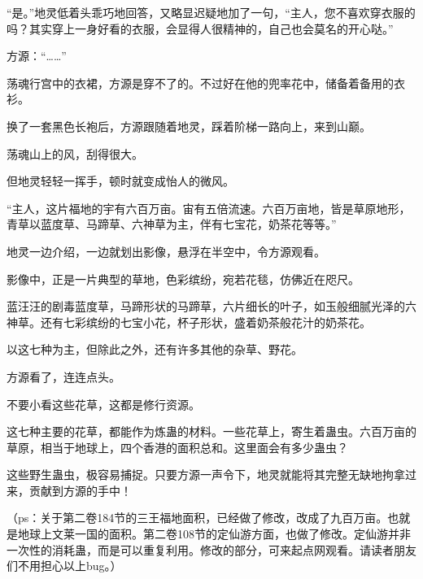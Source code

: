 \begin{this_body}
“是。”地灵低着头乖巧地回答，又略显迟疑地加了一句，“主人，您不喜欢穿衣服的吗？其实穿上一身好看的衣服，会显得人很精神的，自己也会莫名的开心哒。”

方源：“……”

荡魂行宫中的衣裙，方源是穿不了的。不过好在他的兜率花中，储备着备用的衣衫。

换了一套黑色长袍后，方源跟随着地灵，踩着阶梯一路向上，来到山巅。

荡魂山上的风，刮得很大。

但地灵轻轻一挥手，顿时就变成怡人的微风。

“主人，这片福地的宇有六百万亩。宙有五倍流速。六百万亩地，皆是草原地形，青草以蓝度草、马蹄草、六神草为主，伴有七宝花，奶茶花等等。”

地灵一边介绍，一边就划出影像，悬浮在半空中，令方源观看。

影像中，正是一片典型的草地，色彩缤纷，宛若花毯，仿佛近在咫尺。

蓝汪汪的剧毒蓝度草，马蹄形状的马蹄草，六片细长的叶子，如玉般细腻光泽的六神草。还有七彩缤纷的七宝小花，杯子形状，盛着奶茶般花汁的奶茶花。

以这七种为主，但除此之外，还有许多其他的杂草、野花。

方源看了，连连点头。

不要小看这些花草，这都是修行资源。

这七种主要的花草，都能作为炼蛊的材料。一些花草上，寄生着蛊虫。六百万亩的草原，相当于地球上，四个香港的面积总和。这里面会有多少蛊虫？

这些野生蛊虫，极容易捕捉。只要方源一声令下，地灵就能将其完整无缺地拘拿过来，贡献到方源的手中！

（ps：关于第二卷184节的三王福地面积，已经做了修改，改成了九百万亩。也就是地球上文莱一国的面积。第二卷108节的定仙游方面，也做了修改。定仙游并非一次性的消耗蛊，而是可以重复利用。修改的部分，可来起点网观看。请读者朋友们不用担心以上bug。）

\end{this_body}

